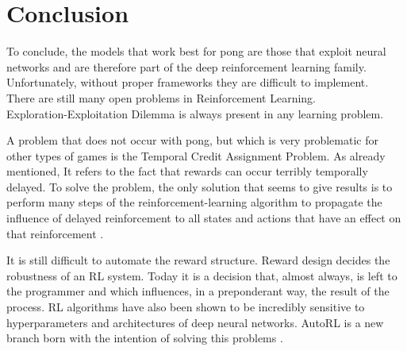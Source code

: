 \section{Conclusion}

To conclude, the models that work best for pong are those that exploit neural networks and are therefore part of the deep reinforcement learning family.
Unfortunately, without proper frameworks they are difficult to implement. \\

There are still many open problems in Reinforcement Learning. \\

Exploration-Exploitation Dilemma is always present in any learning problem.

A problem that does not occur with pong, but which is very problematic for other types of games is the Temporal Credit Assignment Problem. As already mentioned, It refers to the fact that rewards can occur terribly temporally delayed. To solve the problem, the only solution that seems to give results is to perform many steps of the reinforcement-learning algorithm to propagate the influence of delayed reinforcement to all states and actions that have an effect on that reinforcement \cite{sutton1984temporal}. 

It is still difficult to automate the reward structure. Reward design decides the robustness of an RL system.
Today it is a decision that, almost always, is left to the programmer and which influences, 
in a preponderant way, the result of the process. 
RL algorithms have also been shown to be incredibly sensitive to hyperparameters and
architectures of deep neural networks. AutoRL is a new branch born with the intention of solving this problems \cite{parker2022automated}.
